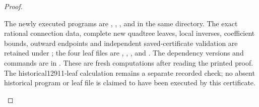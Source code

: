 \begin{proof}
\begin{enumerate}[label=\arabic*.]
The newly executed programs are
,
,
, and
 in the same directory.
The exact rational connection data, complete new quadtree leaves,
local inverses, coefficient bounds, outward endpoints and independent
saved-certificate validation are retained under
; the four leaf files are
,
,
, and
.
The dependency versions and commands are in
.
These are fresh computations after reading the printed proof.
The historical12911-leaf calculation remains a separate recorded
check; no absent historical program or leaf file is claimed to
have been executed by this certificate.

\end{enumerate}
\end{proof}
